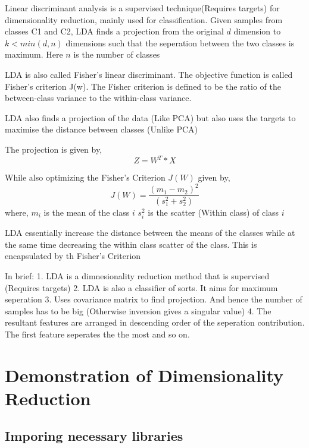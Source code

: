 \documentclass[11pt]{article}
\begin{document}
    Linear discriminant analysis is a supervised technique(Requires targets)
for dimensionality reduction, mainly used for classification. Given
samples from classes C1 and C2, LDA finds a projection from the original
\(d\) dimension to \(k < min ( d , n)\) dimensions such that the
seperation between the two classes is maximum. Here \(n\) is the number
of classes

    LDA is also called Fisher's linear discriminant. The objective function
is called Fisher's criterion J(w). The Fisher criterion is defined to be
the ratio of the between-class variance to the within-class variance.

    LDA also finds a projection of the data (Like PCA) but also uses the
targets to maximise the distance between classes (Unlike PCA)

    The projection is given by, \[Z = W^{T}*X\]

    While also optimizing the Fisher's Criterion \(J(W)\) given by,
\[J(W) = \frac{(m_{1} - m_{2})^{2}}{(s_{1}^{2}+s_{2}^{2})}\] where,
\(m_{i}\) is the mean of the class \(i\) \(s_{i}^{2}\) is the scatter
(Within class) of class \(i\)

    LDA essentially increase the distance between the means of the classes
while at the same time decreasing the within class scatter of the class.
This is encapsulated by th Fisher's Criterion

    In brief: 1. LDA is a dimnesionality reduction method that is supervised
(Requires targets) 2. LDA is also a classifier of sorts. It aims for
maximum seperation 3. Uses covariance matrix to find projection. And
hence the number of samples has to be big (Otherwise inversion gives a
singular value) 4. The resultant features are arranged in descending
order of the seperation contribution. The first feature seperates the
the most and so on.

    \hypertarget{demonstration-of-dimensionality-reduction}{%
\section{Demonstration of Dimensionality
Reduction}\label{demonstration-of-dimensionality-reduction}}

    \hypertarget{imporing-necessary-libraries}{%
\subsection{Imporing necessary
libraries}\label{imporing-necessary-libraries}}
\end{document}
